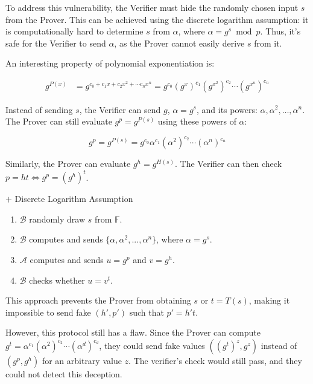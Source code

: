 \documentclass{article}
\begin{document}
To address this vulnerability, the Verifier must hide the randomly chosen input $s$ from the Prover. This can be achieved using the discrete logarithm assumption: it is computationally hard to determine $s$ from $\alpha$, where $\alpha = g^s \bmod p$. Thus, it's safe for the Verifier to send $\alpha$, as the Prover cannot easily derive $s$ from it.

An interesting property of polynomial exponentiation is:

\begin{align}
    g^{P(x)} &= g^{c_0 + c_1 x + c_2 x^{2} + \cdots c_n x^{n}} = g^{c_0} (g^{x})^{c_1}  (g^{x^2})^{c_2} \cdots (g^{x^n})^{c_n}
\end{align}

Instead of sending $s$, the Verifier can send $g$, $\alpha = g^s$, and its powers: $\alpha, \alpha^2, \ldots, \alpha^n$. The Prover can still evaluate $g^p = g^{P(s)}$ using these powers of $\alpha$:

\begin{equation}
    g^{p} = g^{P(s)} = g^{c_0} \alpha^{c_1} (\alpha^{2})^{c_2} \cdots (\alpha^{n})^{c_n}
\end{equation}

Similarly, the Prover can evaluate $g^h = g^{H(s)}$. The Verifier can then check $p = ht \iff g^p = (g^h)^t$.

\begin{protocol}{$+$ Discrete Logarithm Assumption}{}
\begin{enumerate}
    \item $\mathcal{B}$ randomly draw $s$ from $\mathbb{F}$.
    \item $\mathcal{B}$ computes and sends $\{\alpha, \alpha^2, ..., \alpha^{n}\}$, where $\alpha = g^{s}$.
    \item $\mathcal{A}$ computes and sends $u = g^{p}$ and $v = g^{h}$.
    \item $\mathcal{B}$ checks whether $u = v^{t}$.
\end{enumerate}
\end{protocol}

This approach prevents the Prover from obtaining $s$ or $t = T(s)$, making it impossible to send fake $(h', p')$ such that $p' = h't$.

However, this protocol still has a flaw. Since the Prover can compute $g^t = \alpha^{c_1}(\alpha^2)^{c_2}\cdots(\alpha^d)^{c_d}$, they could send fake values $((g^{t})^{z}, g^{z})$ instead of $(g^p, g^h)$ for an arbitrary value $z$. The verifier's check would still pass, and they could not detect this deception.
\end{document}
